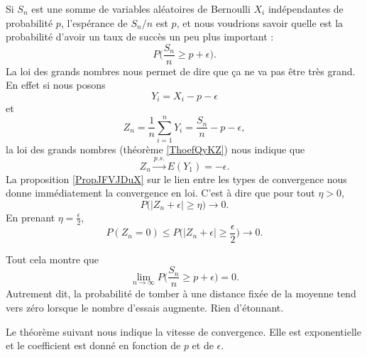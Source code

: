 Si \( S_n\) est une somme de variables aléatoires de Bernoulli \( X_i\) indépendantes de probabilité \( p\), l'espérance de \( S_n/n\) est \( p\), et nous voudrions savoir quelle est la probabilité d'avoir un taux de succès un peu plus important :
\begin{equation}
    P\big( \frac{ S_n }{ n }\geq p+\epsilon \big).
\end{equation}
La loi des grands nombres nous permet de dire que ça ne va pas être très grand. En effet si nous posons
\begin{equation}
    Y_i=X_i-p-\epsilon
\end{equation}
et
\begin{equation}
    Z_n=\frac{1}{ n }\sum_{i=1}^nY_i=\frac{ S_n }{ n }-p-\epsilon,
\end{equation}
la loi des grands nombres (théorème \ref{ThoefQyKZ}) nous indique que
\begin{equation}
    Z_n\stackrel{p.s.}{\longrightarrow}E(Y_1)=-\epsilon.
\end{equation}
La proposition \ref{PropJFVJDuX} sur le lien entre les types de convergence nous donne immédiatement la convergence en loi. C'est à dire que pour tout \( \eta>0\),
\begin{equation}
    P\Big( | Z_n+\epsilon |\geq \eta \Big)\to 0.
\end{equation}
En prenant \( \eta=\frac{ \epsilon }{2}\),
\begin{equation}
    P(Z_n=0)\leq P\big( | Z_n+\epsilon |\geq \frac{ \epsilon }{2} \big)\to 0.
\end{equation}

Tout cela montre que
\begin{equation}
    \lim_{n\to \infty} P\big( \frac{ S_n }{ n }\geq p+\epsilon \big)=0.
\end{equation}
Autrement dit, la probabilité de tomber à une distance fixée de la moyenne tend vers zéro lorsque le nombre d'essais augmente. Rien d'étonnant.

Le théorème suivant nous indique la vitesse de convergence. Elle est exponentielle et le coefficient est donné en fonction de \( p\) et de \( \epsilon\).


